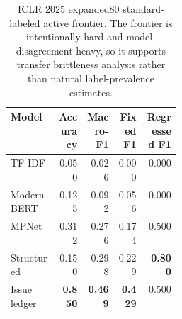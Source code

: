\begin{table}[t]
\centering
\scriptsize
\setlength{\tabcolsep}{3pt}
\begin{tabular}{p{0.28\linewidth}rrrr}
\toprule
Model & Accuracy & Macro-F1 & Fixed F1 & Regressed F1 \\
\midrule
TF-IDF & 0.050 & 0.026 & 0.000 & 0.000 \\
ModernBERT & 0.125 & 0.092 & 0.056 & 0.000 \\
MPNet & 0.312 & 0.276 & 0.174 & 0.500 \\
Structured & 0.150 & 0.298 & 0.229 & \textbf{0.800} \\
Issue ledger & \textbf{0.850} & \textbf{0.469} & \textbf{0.429} & 0.500 \\
\bottomrule
\end{tabular}
\caption{ICLR 2025 expanded80 standard-labeled active frontier. The frontier is intentionally hard and model-disagreement-heavy, so it supports transfer brittleness analysis rather than natural label-prevalence estimates.}
\label{tab:expanded80-transfer}
\end{table}
